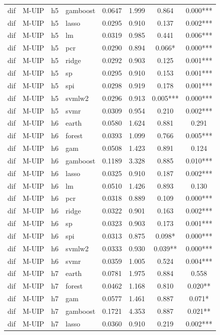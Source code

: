 \begin{ThreePartTable}
\begin{longtable}[t]{llclcccc}
dif & M-UIP & h5 & gamboost & 0.0647 & 1.999 & 0.864 & 0.000***\\
dif & M-UIP & h5 & lasso & 0.0295 & 0.910 & 0.137 & 0.002***\\
dif & M-UIP & h5 & lm & 0.0319 & 0.985 & 0.441 & 0.006***\\
dif & M-UIP & h5 & pcr & 0.0290 & 0.894 & 0.066* & 0.000***\\
dif & M-UIP & h5 & ridge & 0.0292 & 0.903 & 0.125 & 0.001***\\
dif & M-UIP & h5 & sp & 0.0295 & 0.910 & 0.153 & 0.001***\\
dif & M-UIP & h5 & spi & 0.0298 & 0.919 & 0.178 & 0.001***\\
dif & M-UIP & h5 & svmlw2 & 0.0296 & 0.913 & 0.005*** & 0.000***\\
dif & M-UIP & h5 & svmr & 0.0309 & 0.954 & 0.210 & 0.002***\\
\addlinespace
dif & M-UIP & h6 & earth & 0.0580 & 1.624 & 0.881 & 0.291\\
dif & M-UIP & h6 & forest & 0.0393 & 1.099 & 0.766 & 0.005***\\
dif & M-UIP & h6 & gam & 0.0508 & 1.423 & 0.891 & 0.124\\
dif & M-UIP & h6 & gamboost & 0.1189 & 3.328 & 0.885 & 0.010***\\
dif & M-UIP & h6 & lasso & 0.0325 & 0.910 & 0.187 & 0.002***\\
dif & M-UIP & h6 & lm & 0.0510 & 1.426 & 0.893 & 0.130\\
dif & M-UIP & h6 & pcr & 0.0318 & 0.889 & 0.109 & 0.000***\\
dif & M-UIP & h6 & ridge & 0.0322 & 0.901 & 0.163 & 0.002***\\
dif & M-UIP & h6 & sp & 0.0323 & 0.903 & 0.173 & 0.001***\\
dif & M-UIP & h6 & spi & 0.0313 & 0.875 & 0.098* & 0.000***\\
dif & M-UIP & h6 & svmlw2 & 0.0333 & 0.930 & 0.039** & 0.000***\\
dif & M-UIP & h6 & svmr & 0.0359 & 1.005 & 0.524 & 0.004***\\
\addlinespace
dif & M-UIP & h7 & earth & 0.0781 & 1.975 & 0.884 & 0.558\\
dif & M-UIP & h7 & forest & 0.0462 & 1.168 & 0.810 & 0.020**\\
dif & M-UIP & h7 & gam & 0.0577 & 1.461 & 0.887 & 0.071*\\
dif & M-UIP & h7 & gamboost & 0.1721 & 4.353 & 0.887 & 0.021**\\
dif & M-UIP & h7 & lasso & 0.0360 & 0.910 & 0.219 & 0.002***\\

\end{longtable}
\end{ThreePartTable}
